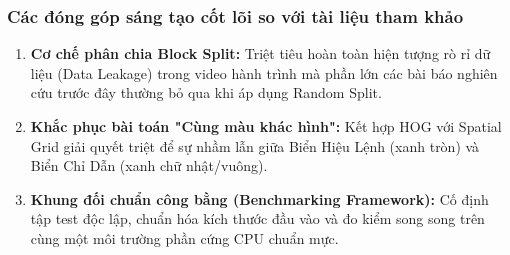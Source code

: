 \subsubsection{Các đóng góp sáng tạo cốt lõi so với tài liệu tham khảo}
\label{subsubsec:dong_gop_sang_tao}

\begin{enumerate}
    \item \textbf{Cơ chế phân chia Block Split:} Triệt tiêu hoàn toàn hiện tượng rò rỉ dữ liệu (Data Leakage) trong video hành trình mà phần lớn các bài báo nghiên cứu trước đây thường bỏ qua khi áp dụng Random Split.
    \item \textbf{Khắc phục bài toán "Cùng màu khác hình":} Kết hợp HOG với Spatial Grid giải quyết triệt để sự nhầm lẫn giữa Biển Hiệu Lệnh (xanh tròn) và Biển Chỉ Dẫn (xanh chữ nhật/vuông).
    \item \textbf{Khung đối chuẩn công bằng (Benchmarking Framework):} Cố định tập test độc lập, chuẩn hóa kích thước đầu vào và đo kiểm song song trên cùng một môi trường phần cứng CPU chuẩn mực.
\end{enumerate}

